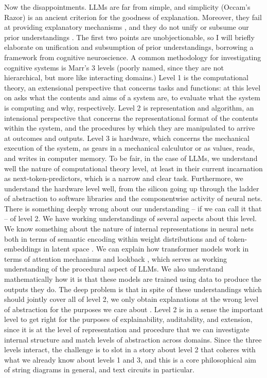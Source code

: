 Now the disappointments. LLMs are far from simple, and simplicity (Occam's Razor) is an ancient criterion for the goodness of explanation. Moreover, they fail at providing explanatory mechanisms \citep{}, and they do not unify or subsume our prior understandings \citep{}. The first two points are unobjectionable, so I will briefly elaborate on unification and subsumption of prior understandings, borrowing a framework from cognitive neuroscience. A common methodology for investigating cognitive systems is Marr's 3 levels \citep{} (poorly named, since they are not hierarchical, but more like interacting domains.) Level 1 is the computational theory, an extensional perspective that concerns tasks and functions: at this level on asks what the contents and aims of a system are, to evaluate what the system is computing and why, respectively. Level 2 is representation and algorithm, an intensional perspective that concerns the representational format of the contents within the system, and the procedures by which they are manipulated to arrive at outcomes and outputs. Level 3 is hardware, which concerns the mechanical execution of the system, as gears in a mechanical calculutor or as values, reads, and writes in computer memory. To be fair, in the case of LLMs, we understand well the nature of computational theory level, at least in their current incarnation as next-token-predictors, which is a narrow and clear task. Furthermore, we understand the hardware level well, from the silicon going up through the ladder of abstraction to software libraries and the componentwise activity of neural nets. There is something deeply wrong about our understanding -- if we can call it that -- of level 2. We have working understandings of several aspects about this level. We know something about the nature of internal representations in neural nets both in terms of semantic encoding within weight distributions \citep{} and of token-embeddings in latent space \citep{}. We can explain how transformer models work in terms of attention mechanisms and lookback \citep{}, which serves as working understanding of the procedural aspect of LLMs. We also understand mathematically how it is that these models are trained using data to produce the outputs they do. The deep problem is that in spite of these understandings which should jointly cover all of level 2, we only obtain explanations at the wrong level of abstraction for the purposes we care about \citep{}. Level 2 is in a sense the important level to get right for the purposes of explainability, auditability, and extension, since it is at the level of representation and procedure that we can investigate internal structure and match levels of abstraction across domains. Since the three levels interact, the challenge is to slot in a story about level 2 that coheres with what we already know about levels 1 and 3, and this is a core philosophical aim of string diagrams in general, and text circuits in particular.

